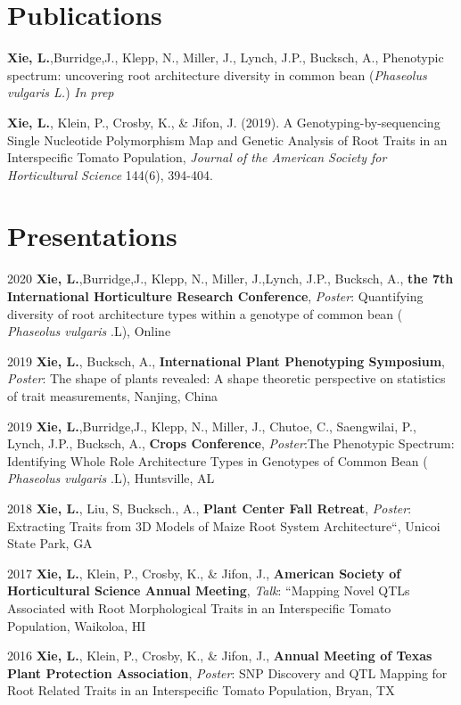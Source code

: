 \documentclass[11pt, a4paper]{awesome-cv}
\begin{document}
\section{Publications}\label{publications}

\textbf{Xie, L.},Burridge,J., Klepp, N., Miller, J., Lynch, J.P.,
Bucksch, A., Phenotypic spectrum: uncovering root architecture diversity
in common bean (\emph{Phaseolus vulgaris L.}) \emph{In prep}

\textbf{Xie, L.}, Klein, P., Crosby, K., \& Jifon, J. (2019). A
Genotyping-by-sequencing Single Nucleotide Polymorphism Map and Genetic
Analysis of Root Traits in an Interspecific Tomato Population,
\emph{Journal of the American Society for Horticultural Science} 144(6),
394-404.

\section{Presentations}\label{presentations}

2020 \textbf{Xie, L.},Burridge,J., Klepp, N., Miller, J.,Lynch, J.P.,
Bucksch, A., \textbf{the 7th International Horticulture Research
Conference}, \emph{Poster}: Quantifying diversity of root architecture
types within a genotype of common bean ( \emph{Phaseolus vulgaris} .L),
Online

2019 \textbf{Xie, L.}, Bucksch, A., \textbf{International Plant
Phenotyping Symposium}, \emph{Poster}: The shape of plants revealed: A
shape theoretic perspective on statistics of trait measurements,
Nanjing, China

2019 \textbf{Xie, L.},Burridge,J., Klepp, N., Miller, J., Chutoe, C.,
Saengwilai, P., Lynch, J.P., Bucksch, A., \textbf{Crops Conference},
\emph{Poster}:The Phenotypic Spectrum: Identifying Whole Role
Architecture Types in Genotypes of Common Bean ( \emph{Phaseolus
vulgaris} .L), Huntsville, AL

2018 \textbf{Xie, L.}, Liu, S, Bucksch., A., \textbf{Plant Center Fall
Retreat}, \emph{Poster}: Extracting Traits from 3D Models of Maize Root
System Architecture``, Unicoi State Park, GA

2017 \textbf{Xie, L.}, Klein, P., Crosby, K., \& Jifon, J.,
\textbf{American Society of Horticultural Science Annual Meeting},
\emph{Talk}: ``Mapping Novel QTLs Associated with Root Morphological
Traits in an Interspecific Tomato Population, Waikoloa, HI

2016 \textbf{Xie, L.}, Klein, P., Crosby, K., \& Jifon, J.,
\textbf{Annual Meeting of Texas Plant Protection Association},
\emph{Poster}: SNP Discovery and QTL Mapping for Root Related Traits in
an Interspecific Tomato Population, Bryan, TX
\end{document}
